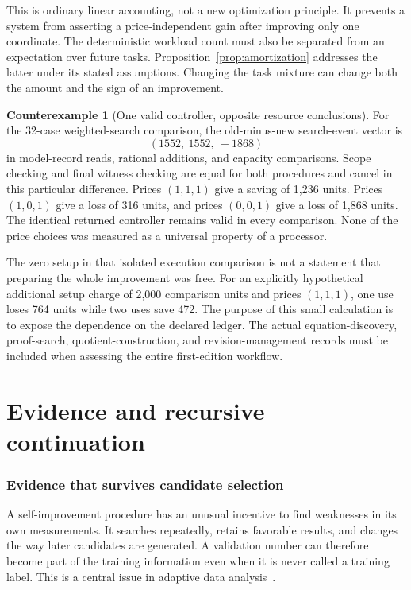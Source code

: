 \documentclass[11pt,letterpaper]{article}
\theoremstyle{plain}
\theoremstyle{definition}
\newtheorem{counterexample}[theorem]{Counterexample}
\begin{document}
This is ordinary linear accounting, not a new optimization principle. It prevents a system from asserting a price-independent gain after improving only one coordinate. The deterministic workload count must also be separated from an expectation over future tasks. Proposition~\ref{prop:amortization} addresses the latter under its stated assumptions. Changing the task mixture can change both the amount and the sign of an improvement.

\begin{counterexample}[One valid controller, opposite resource conclusions]\label{ex:price-change}
For the 32-case weighted-search comparison, the old-minus-new search-event vector is
\[
 (1552,\ 1552,\ -1868)
\]
in model-record reads, rational additions, and capacity comparisons. Scope checking and final witness checking are equal for both procedures and cancel in this particular difference. Prices $(1,1,1)$ give a saving of 1,236 units. Prices $(1,0,1)$ give a loss of 316 units, and prices $(0,0,1)$ give a loss of 1,868 units. The identical returned controller remains valid in every comparison. None of the price choices was measured as a universal property of a processor.
\end{counterexample}

The zero setup in that isolated execution comparison is not a statement that preparing the whole improvement was free. For an explicitly hypothetical additional setup charge of 2,000 comparison units and prices $(1,1,1)$, one use loses 764 units while two uses save 472. The purpose of this small calculation is to expose the dependence on the declared ledger. The actual equation-discovery, proof-search, quotient-construction, and revision-management records must be included when assessing the entire first-edition workflow.

\clearpage\part{Evidence and recursive continuation}
\section{Evidence that survives candidate selection}\label{sec:evidence}
A self-improvement procedure has an unusual incentive to find weaknesses in its own measurements. It searches repeatedly, retains favorable results, and changes the way later candidates are generated. A validation number can therefore become part of the training information even when it is never called a training label. This is a central issue in adaptive data analysis~\cite{dwork}.
\end{document}
